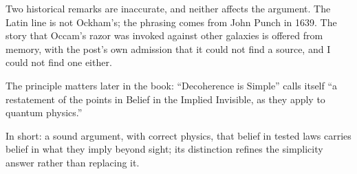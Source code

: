 \begin{afterword}
Two historical remarks are inaccurate, and neither affects the argument. The Latin line is not Ockham's; the phrasing comes from John Punch in 1639. The story that Occam's razor was invoked against other galaxies is offered from memory, with the post's own admission that it could not find a source, and I could not find one either.

The principle matters later in the book: ``Decoherence is Simple'' calls itself ``a restatement of the points in Belief in the Implied Invisible, as they apply to quantum physics.''

In short: a sound argument, with correct physics, that belief in tested laws carries belief in what they imply beyond sight; its distinction refines the simplicity answer rather than replacing it.
\end{afterword}
